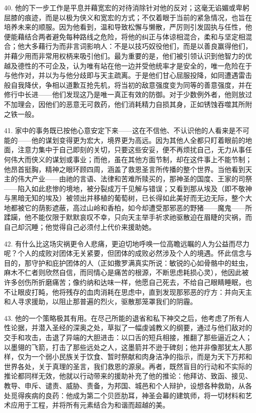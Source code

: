 40. 他的下一步工作是平息并藉宽宏的对待消除针对他的反对；这毫无谄媚或卑躬屈膝的痕迹，而是以极为侠义和宽宏的方式；不仅着眼于当前的紧急情况，也旨在培养未来的顺服。因为他看到，温和导致松懈与懒散，严厉则引发固执与任性，他便能藉结合两者避免每种路线之危险，将他的纠正与体谅相混合，柔和与坚定相混合；他大多藉行为而非言词影响人：不是以技巧奴役他们，而是以善良赢得他们，并藉少用而非常用权柄来吸引他们。最为重要的是，他们被引领认识到他智力的优越及德性的不可企及，认为唯有站在他一边并受他统率才是安全的，唯一危险在于与他作对，并以为与他分歧即与天主疏离。于是他们甘心屈服投降，如同遭遇雷击般自我降伏，争相以道歉互抢先机，将当初的敌意强度变为同等的善意强度，并在修行中长进——他们发现这乃是唯一真正有效的防御。对于少数例外者，他则放过不加理会，因他们的恶意无可救药，他们消耗精力自损其身，正如锈蚀吞噬其所附之铁一般。\par

41. 家中的事务既已按他心意安定下来——这在不信他、不认识他的人看来是不可能的——他的谋划变得更为宏大，境界更为高远。因为其他人全都只盯着眼前的地面，注意力集中于自己即刻的关切，只要这些安妥，便不再烦扰自己，无力从事任何伟大而侠义的谋划或事业；而他，虽在其他方面节制，却在这件事上不能节制；他昂首挺胸，精神之眼环顾四周，涵盖了救恩圣言所传播的整个世界。当他看到天主的伟大产业——由祂的言语、法律和苦难所赎买的，那神圣的国度、王家的司祭——陷入如此悲惨的境地，被分裂成万千见解与错误；又看到那从埃及（即不敬神与黑暗无知的埃及）被领出并移植的葡萄树，已长得如此美好而无边无际，整个大地都被它的荫影遮蔽，高过山岭和香柏，如今却遭受那邪恶的野猪——魔鬼——所蹂躏，他不能仅限于默默哀叹不幸，只向天主举手祈求祂驱散迫在眉睫的灾祸，而自己却沉睡；他觉得自己必须付上代价来援助她。\par

42. 有什么比这场灾祸更令人悲痛，更迫切地呼唤一位高瞻远瞩的人为公益而尽力呢？个人的成败对团体无关紧要，但团体的成败必然涉及个人的境遇。怀此信念与目的，那守护和庇护团体的人（正如撒罗满真实所说：敏锐的心如骨骼中的蛀虫，麻木不仁者则欣然自信，而同情心是痛苦的根源，不断思虑耗损心灵），他因此被许多创伤所折磨痛苦；像约纳和达味一样，他愿自己死去，不给自己眼睛睡眠，也不让眼皮打盹，他将残存的血肉消耗在思虑中，直到发现那邪恶的疗方：并向天主和人寻求援助，以阻止那普遍的烈火，驱散那笼罩我们的阴霾。\par

43. 他的一个策略极其有用。在尽己所能的退省和私下神交之后，他考虑了所有人性论据，并潜入圣经的深奥之处，草拟了一幅虔诚教义的纲要，通过与他们敌对的交手和攻击，击退了异端的大胆进击：以口舌的短兵相接，推翻了那些逼近之人；以墨翎的飞箭，打击了那些远处之人，这墨箭并不逊于碑刻；他并非像那犹太人那样，仅为一个弱小民族关于饮食、暂时祭献和肉身洁净的指示，而是为天下万邦和世界各处，关于真理的圣言，我们救恩的源泉。再者，既然盲目的行动和不实际的推论都同样无效，他就以行动带来的援助补充了他的推论：他拜访、致函、接见、教导、申斥、谴责、威胁、责备，为邦国、城邑和个人辩护，设想各种救助，从各处觅得疾病的良药：他成为第二个贝匝肋耳，神圣会幕的建筑师，将一切材料和艺术应用于工程，并将所有元素结合为和谐而超越的美。\par

